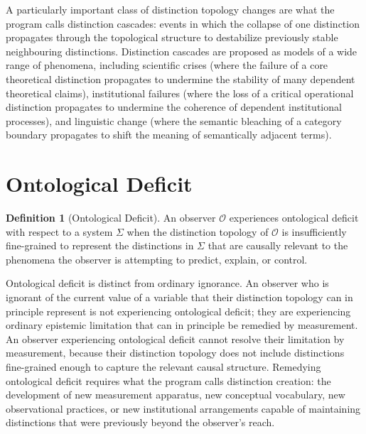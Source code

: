 \documentclass[11pt, oneside]{book}
\theoremstyle{definition}
\newtheorem{definition}{Definition}[chapter]
\theoremstyle{remark}
\begin{document}
A particularly important class of distinction topology changes are what the program calls distinction cascades: events in which the collapse of one distinction propagates through the topological structure to destabilize previously stable neighbouring distinctions. Distinction cascades are proposed as models of a wide range of phenomena, including scientific crises (where the failure of a core theoretical distinction propagates to undermine the stability of many dependent theoretical claims), institutional failures (where the loss of a critical operational distinction propagates to undermine the coherence of dependent institutional processes), and linguistic change (where the semantic bleaching of a category boundary propagates to shift the meaning of semantically adjacent terms).

\section{Ontological Deficit}

\begin{definition}[Ontological Deficit]
An observer $\mathcal{O}$ experiences ontological deficit with respect to a system $\Sigma$ when the distinction topology of $\mathcal{O}$ is insufficiently fine-grained to represent the distinctions in $\Sigma$ that are causally relevant to the phenomena the observer is attempting to predict, explain, or control.
\end{definition}

Ontological deficit is distinct from ordinary ignorance. An observer who is ignorant of the current value of a variable that their distinction topology can in principle represent is not experiencing ontological deficit; they are experiencing ordinary epistemic limitation that can in principle be remedied by measurement. An observer experiencing ontological deficit cannot resolve their limitation by measurement, because their distinction topology does not include distinctions fine-grained enough to capture the relevant causal structure. Remedying ontological deficit requires what the program calls distinction creation: the development of new measurement apparatus, new conceptual vocabulary, new observational practices, or new institutional arrangements capable of maintaining distinctions that were previously beyond the observer's reach.
\end{document}
